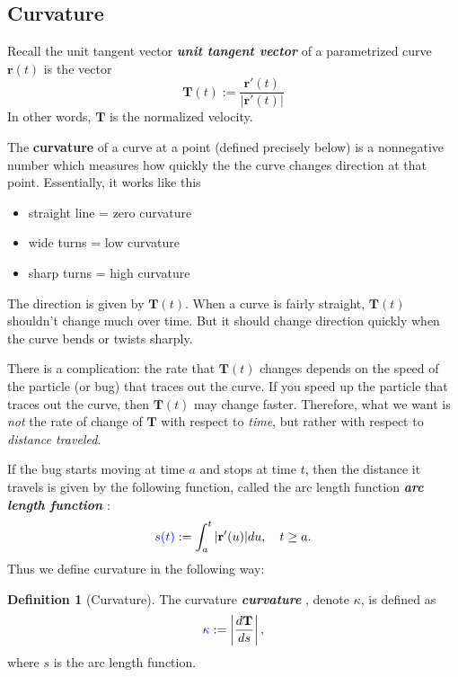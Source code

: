 \documentclass[10pt]{article}
\DeclareRobustCommand{\demph}[1]{%
  \ifmmode
  {\color{Blue}#1}%
  \else
  {\color{Blue}\bfseries\slshape #1}%
  \fi
}
\theoremstyle{definition}
\newtheorem{definition}[theorem]{Definition}
\newcommand{\1}[1]{\textbf{1}_{\left[#1\right]}} %
\begin{document}
\subsection{Curvature}
Recall the \demph{unit tangent vector} of a parametrized curve $\mathbf{r}(t)$ is the vector
\begin{equation*}
  \mathbf{T}(t) := \frac{\mathbf{r}'(t)}{|\mathbf{r}'(t)|}
\end{equation*}
In other words, $\mathbf{T}$ is the normalized velocity.

The \textbf{curvature} of a curve at a point (defined precisely below) is a
nonnegative number which measures how quickly the the curve changes direction
at that point. Essentially, it works like this
\begin{itemize}
  \item straight line = zero curvature
  \item wide turns = low curvature
  \item sharp turns = high curvature
\end{itemize}
The direction is given by $\mathbf{T}(t)$. When a curve is fairly straight, $\mathbf{T}(t)$ shouldn't change
much over time. But it should change direction quickly when the curve bends or twists sharply.


There is a complication: the rate that $\mathbf{T}(t)$ changes depends on the
speed of the particle (or bug) that traces out the curve. If you speed up the
particle that traces out the curve, then $\mathbf{T}(t)$ may change faster.
Therefore, what we want is \textit{not} the rate of change of $\mathbf{T}$
with respect to \textit{time}, but rather with respect to \textit{distance
  traveled}.

If the bug starts moving at time $a$ and stops at time $t$, then the distance
it travels is given by the following function, called the \demph{arc length function}:
\begin{equation*}
  \demph{s(t)} := \int_{a}^{t}|\mathbf{r}'(u)| du, \quad t \geq a.
\end{equation*}
Thus we define curvature in the following way:
\begin{definition}[Curvature]
  \label{def:curvature}
  The \demph{curvature}, denote $\kappa$, is defined as
  \begin{equation*}
    \demph{\kappa} := \left| \frac{d\mathbf{T}}{ds} \right|,
  \end{equation*}
  where $s$ is the arc length function.
\end{definition}
\end{document}
